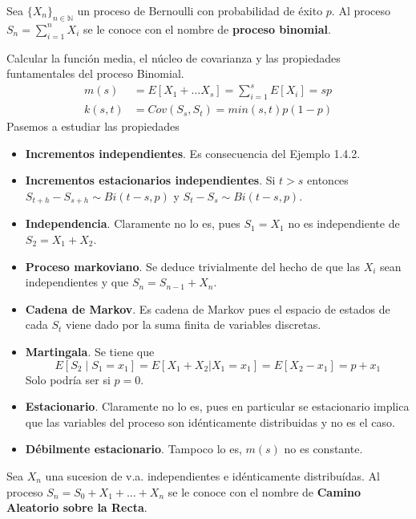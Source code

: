 \documentclass[PREyA.tex]{subfiles}
\begin{document}
\begin{defi}
Sea $\{X_n\}_{n \in \mathbb{N}}$ un proceso de Bernoulli con probabilidad de éxito $p$. Al proceso $ S_n = \sum_{i=1}^n X_i$ se le conoce con el nombre de \textbf{proceso binomial}.
\end{defi}

\begin{example}
Calcular la función media, el núcleo de covarianza y las propiedades funtamentales del proceso Binomial.
\begin{align*}
m(s) &= E[X_1 + \dotsc X_s] = \sum_{i=1}^s E[X_i] = sp\\
k(s,t) &= Cov(S_s, S_t) = min(s,t) p(1-p)
\end{align*}
Pasemos a estudiar las propiedades
\begin{itemize}
\item \textbf{Incrementos independientes}. Es consecuencia del Ejemplo 1.4.2. 
\item \textbf{Incrementos estacionarios independientes}. Si $t>s$ entonces  $S_{t+h}-S_{s+h} \sim Bi(t-s,p)$ y $S_{t}-S_{s} \sim Bi(t-s,p)$.
\item \textbf{Independencia}. Claramente no lo es, pues $S_1 = X_1$ no es independiente de $S_2 = X_1+ X_2$.
\item \textbf{Proceso markoviano}. Se deduce trivialmente del hecho de que las $X_i$ sean independientes y que $S_n = S_{n-1}+X_n$.
\item \textbf{Cadena de Markov}. Es cadena de Markov pues el espacio de estados de cada $S_t$ viene dado por la suma finita de variables discretas.
\item \textbf{Martingala}. Se tiene que
$$E[S_2\mid S_1=x_1] = E[X_1+X_2|X_1 = x_1] = E[X_2-x_1] = p+x_1$$
Solo podría ser si $p=0$.
\item \textbf{Estacionario}. Claramente no lo es, pues en particular se estacionario implica que las variables del proceso son idénticamente distribuidas y no es el caso. 
\item \textbf{Débilmente estacionario}. Tampoco lo es, $m(s)$ no es constante.
\end{itemize}
\end{example}

\begin{defi}
Sea $X_n$ una sucesion de v.a. independientes e idénticamente distribuídas. Al proceso $S_n = S_0 + X_1 + \dotsc + X_n$ se le conoce con el nombre de \textbf{Camino Aleatorio sobre la Recta}.
\end{defi}
\end{document}
